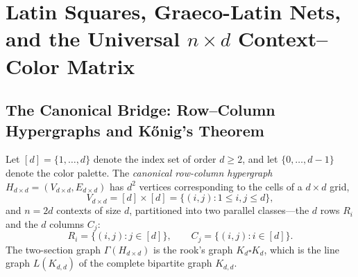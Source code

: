 \documentclass[aps,pra,reprint,superscriptaddress,longbibliography,nofootinbib,floatfix,10pt]{revtex4-2}
\theoremstyle{definition}\newtheorem{definition}[theorem]{Definition}
\theoremstyle{remark}\newtheorem{remark}[theorem]{Remark}
\begin{document}
\section{Latin Squares, Graeco-Latin Nets, and the Universal \texorpdfstring{$n\times d$}{n x d} Context--Color Matrix}\label{sec:framework}

\subsection{The Canonical Bridge: Row--Column Hypergraphs and K\H{o}nig's Theorem}\label{sec:row-col}

Let $[d]=\{1,\ldots,d\}$ denote the index set of order $d\ge 2$, and let $\{0,\ldots,d-1\}$ denote the color palette. The \emph{canonical row-column hypergraph} $H_{d\times d}=(V_{d\times d},E_{d\times d})$ has $d^2$ vertices corresponding to the cells of a $d\times d$ grid,
\begin{equation}\label{eq:grid-vertices}
V_{d\times d}=[d]\times[d]=\{(i,j):1\le i,j\le d\},
\end{equation}
and $n=2d$ contexts of size $d$, partitioned into two parallel classes—the $d$ rows $R_i$ and the $d$ columns $C_j$:
\begin{equation}\label{eq:grid-contexts}
R_i=\{(i,j):j\in[d]\},\qquad C_j=\{(i,j):i\in[d]\}.
\end{equation}
The two-section graph $\Gamma(H_{d\times d})$ is the rook's graph $K_d\square K_d$, which is the line graph $L(K_{d,d})$ of the complete bipartite graph $K_{d,d}$.
\end{document}
